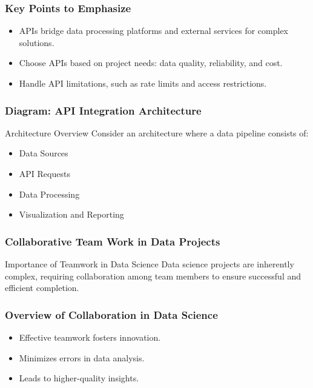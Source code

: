 \documentclass[aspectratio=169]{beamer}
\begin{document}
\begin{frame}
    \frametitle{Key Points to Emphasize}
    \begin{itemize}
        \item APIs bridge data processing platforms and external services for complex solutions.
        \item Choose APIs based on project needs: data quality, reliability, and cost.
        \item Handle API limitations, such as rate limits and access restrictions.
    \end{itemize}
\end{frame}

\begin{frame}
    \frametitle{Diagram: API Integration Architecture}
    \begin{block}{Architecture Overview}
        Consider an architecture where a data pipeline consists of:
        \begin{itemize}
            \item Data Sources
            \item API Requests
            \item Data Processing
            \item Visualization and Reporting
        \end{itemize}
    \end{block}
\end{frame}

\begin{frame}[fragile]
    \frametitle{Collaborative Team Work in Data Projects}
    \begin{block}{Importance of Teamwork in Data Science}
        Data science projects are inherently complex, requiring collaboration among team members to ensure successful and efficient completion.
    \end{block}
\end{frame}

\begin{frame}[fragile]
    \frametitle{Overview of Collaboration in Data Science}
    \begin{itemize}
        \item Effective teamwork fosters innovation.
        \item Minimizes errors in data analysis.
        \item Leads to higher-quality insights.
    \end{itemize}
\end{frame}
\end{document}
